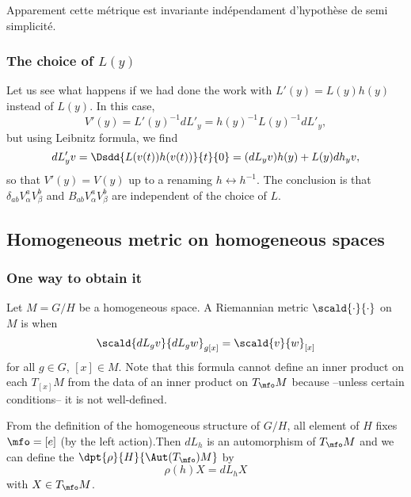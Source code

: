 \begin{probleme}
Apparement cette métrique est invariante indépendament d'hypothèse de semi simplicité.
\end{probleme}

\subsubsection{The choice of \texorpdfstring{$L(y)$}{L(y)}}

Let us see what happens if we had done the work with $L'(y)=L(y)h(y)$ instead of $L(y)$. In this case, 
\[
   V'(y)=L'(y)^{-1} dL'_y=h(y)^{-1} L(y)^{-1} dL'_y,
\]
but using Leibnitz formula, we find
\begin{equation}
   dL'_yv=\Dsdd{L(v(t))h(v(t))}{t}{0}
         =(dL_yv)h(y)+L(y)dh_yv,
\end{equation}
so that $V'(y)=V(y)$ up to a renaming $h\leftrightarrow h^{-1}$. The conclusion is that $\delta_{ab}V_{\alpha}^a V_{\beta}^b$ and $B_{ab}V_{\alpha}^aV_{\beta}^b$ are independent of the choice of $L$.

\subsection{Homogeneous metric on homogeneous spaces}

\subsubsection{One way to obtain it}

Let $M=G/H$ be a homogeneous space. A Riemannian metric $\scald{\cdot}{\cdot}$ on $M$ is  when
\begin{equation}\label{eq:def:homo_metric}
\scald{dL_gv}{dL_gw}_{g[x]}=\scald{v}{w}_{[x]}
\end{equation}
for all $g\in G$, $[x]\in M$. Note that this formula cannot define an inner product on each $T_{[x]}M$ from the data of an inner product on $T_{\mfo}M$ because --unless certain conditions-- it is not well-defined.

From the definition of the homogeneous structure of $G/H$, all element of $H$ fixes $\mfo=[e]$ (by the left action).Then $dL_h$ is an automorphism of $T_{\mfo}M$ and we can define the  $\dpt{\rho}{H}{\Aut(T_{\mfo})M}$ by
\[
   \rho(h)X=dL_hX
\]
with $X\in T_{\mfo}M$.

